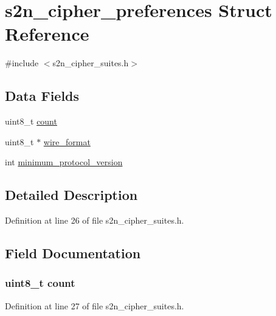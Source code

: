 \hypertarget{structs2n__cipher__preferences}{}\section{s2n\+\_\+cipher\+\_\+preferences Struct Reference}
\label{structs2n__cipher__preferences}


{\ttfamily \#include $<$s2n\+\_\+cipher\+\_\+suites.\+h$>$}

\subsection*{Data Fields}
\begin{DoxyCompactItemize}
\item 
uint8\+\_\+t \hyperlink{structs2n__cipher__preferences_a20302e2c99a60d3f612dba57e3f6333b}{count}
\item 
uint8\+\_\+t $\ast$ \hyperlink{structs2n__cipher__preferences_acc56b427760b185ee09b05e370850623}{wire\+\_\+format}
\item 
int \hyperlink{structs2n__cipher__preferences_a98d8055e86b9652d5448a1a82a9f9407}{minimum\+\_\+protocol\+\_\+version}
\end{DoxyCompactItemize}


\subsection{Detailed Description}


Definition at line 26 of file s2n\+\_\+cipher\+\_\+suites.\+h.



\subsection{Field Documentation}
\subsubsection[{\texorpdfstring{count}{count}}]{\setlength{\rightskip}{0pt plus 5cm}uint8\+\_\+t count}\hypertarget{structs2n__cipher__preferences_a20302e2c99a60d3f612dba57e3f6333b}{}\label{structs2n__cipher__preferences_a20302e2c99a60d3f612dba57e3f6333b}


Definition at line 27 of file s2n\+\_\+cipher\+\_\+suites.\+h.

